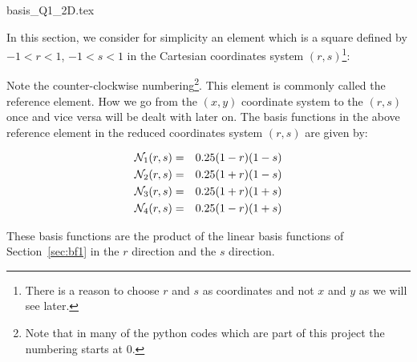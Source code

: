 \begin{flushright} {\tiny {\color{gray} basis\_Q1\_2D.tex}} \end{flushright}

In this section, we consider for simplicity an element which is a square defined 
by $-1<r<1$, $-1<s<1$ in the Cartesian coordinates system $(r,s)$\footnote{There is a 
reason to choose $r$ and $s$ as coordinates and not $x$ and $y$ as we will see later.}:



Note the counter-clockwise numbering\footnote{Note that in many of the python codes which 
are part of this project the numbering starts at 0.}.
This element is commonly called the reference element. How we go from the $(x,y)$ coordinate system 
to the $(r,s)$ once and vice versa will be dealt with later on.
The basis functions in the above reference element in the reduced 
coordinates system $(r,s)$ are given by:

\begin{mdframed}[backgroundcolor=blue!5]
\begin{eqnarray}
{\mathcal{N}}_1(r,s)&=&0.25(1-r)(1-s) \nonumber\\
{\mathcal{N}}_2(r,s)&=&0.25(1+r)(1-s) \nonumber\\
{\mathcal{N}}_3(r,s)&=&0.25(1+r)(1+s) \nonumber\\
{\mathcal{N}}_4(r,s)&=&0.25(1-r)(1+s) 
\end{eqnarray}
\end{mdframed}
These basis functions are the product of the linear basis functions of Section~\ref{sec:bf1}
in the $r$ direction and the $s$ direction.

